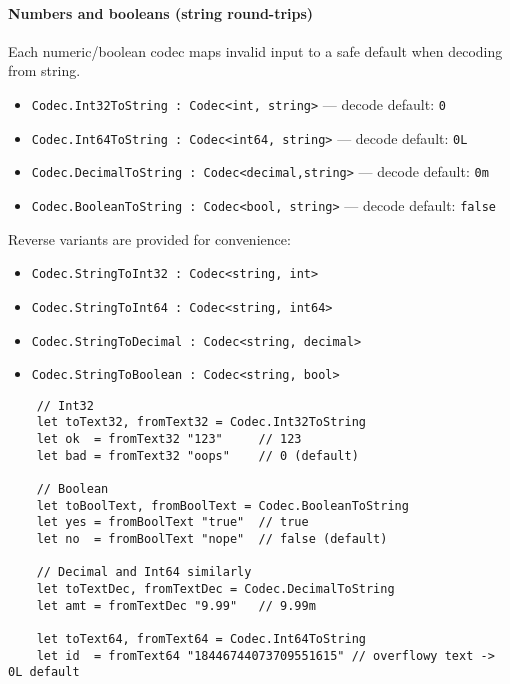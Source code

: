 \documentclass{article}
\begin{document}
\paragraph{Numbers and booleans (string round-trips)}
Each numeric/boolean codec maps invalid input to a safe default when decoding from string.
\begin{itemize}
  \item \texttt{Codec.Int32ToString   : Codec<int,    string>} — decode default: \texttt{0}
  \item \texttt{Codec.Int64ToString   : Codec<int64,  string>} — decode default: \texttt{0L}
  \item \texttt{Codec.DecimalToString : Codec<decimal,string>} — decode default: \texttt{0m}
  \item \texttt{Codec.BooleanToString : Codec<bool,   string>} — decode default: \texttt{false}
\end{itemize}
Reverse variants are provided for convenience:
\begin{itemize}
  \item \texttt{Codec.StringToInt32    : Codec<string, int>}
  \item \texttt{Codec.StringToInt64    : Codec<string, int64>}
  \item \texttt{Codec.StringToDecimal  : Codec<string, decimal>}
  \item \texttt{Codec.StringToBoolean  : Codec<string, bool>}
\end{itemize}
\begin{verbatim}
    // Int32
    let toText32, fromText32 = Codec.Int32ToString
    let ok  = fromText32 "123"     // 123
    let bad = fromText32 "oops"    // 0 (default)

    // Boolean
    let toBoolText, fromBoolText = Codec.BooleanToString
    let yes = fromBoolText "true"  // true
    let no  = fromBoolText "nope"  // false (default)

    // Decimal and Int64 similarly
    let toTextDec, fromTextDec = Codec.DecimalToString
    let amt = fromTextDec "9.99"   // 9.99m

    let toText64, fromText64 = Codec.Int64ToString
    let id  = fromText64 "18446744073709551615" // overflowy text -> 0L default
\end{verbatim}
\end{document}
